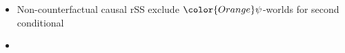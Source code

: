 \begin{frame}[t]
	\subsectionpage\vskip 9pt
	\begin{itemize}
        \item<1->	Non-counterfactual causal rSS exclude ${\color{Orange}\psi}$-worlds for second conditional
	\end{itemize}\vspace{-5mm}
	\begin{figure}[ht!]
\centering

\label{fig:exclusion}
\end{figure}\vspace{-7.5mm}
	\begin{itemize}
        \item<4->  
	\end{itemize}
\end{frame}